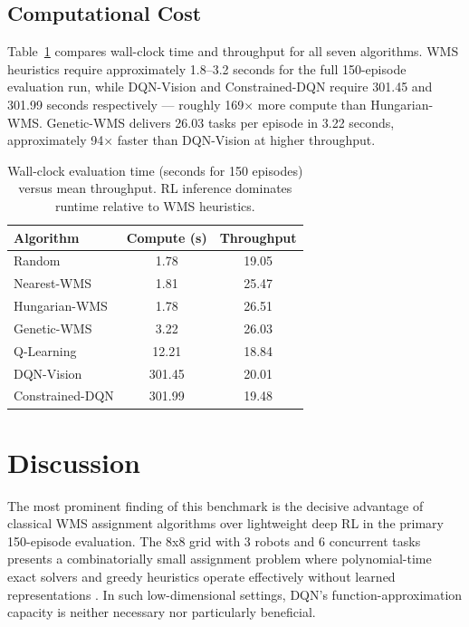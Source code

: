 \documentclass[conference]{IEEEtran}
\begin{document}
\subsection{Computational Cost}

Table~\ref{tab:Compute} compares wall-clock time and throughput for all seven algorithms.
WMS heuristics require approximately 1.8--3.2 seconds for the full 150-episode evaluation run, while DQN-Vision and Constrained-DQN require 301.45 and 301.99 seconds respectively --- roughly 169$\times$ more compute than Hungarian-WMS.
Genetic-WMS delivers 26.03 tasks per episode in 3.22 seconds, approximately 94$\times$ faster than DQN-Vision at higher throughput.

\begin{table}[!ht]
\centering
\caption{Wall-clock evaluation time (seconds for 150 episodes) versus mean throughput. RL inference dominates runtime relative to WMS heuristics.}
\label{tab:Compute}
\renewcommand{\arraystretch}{1.1}
\begin{tabular}{|l|c|c|}
\hline
\textbf{Algorithm} & \textbf{Compute (s)} & \textbf{Throughput} \\
\hline
Random           & 1.78   & 19.05 \\
Nearest-WMS      & 1.81   & 25.47 \\
Hungarian-WMS    & 1.78   & 26.51 \\
Genetic-WMS      & 3.22   & 26.03 \\
Q-Learning       & 12.21  & 18.84 \\
DQN-Vision       & 301.45 & 20.01 \\
Constrained-DQN  & 301.99 & 19.48 \\
\hline
\end{tabular}
\end{table}


\section{Discussion}

The most prominent finding of this benchmark is the decisive advantage of classical WMS assignment algorithms over lightweight deep RL in the primary 150-episode evaluation.
The 8x8 grid with 3 robots and 6 concurrent tasks presents a combinatorially small assignment problem where polynomial-time exact solvers and greedy heuristics operate effectively without learned representations \cite{burkard2009assignment}.
In such low-dimensional settings, DQN's function-approximation capacity is neither necessary nor particularly beneficial.
\end{document}
